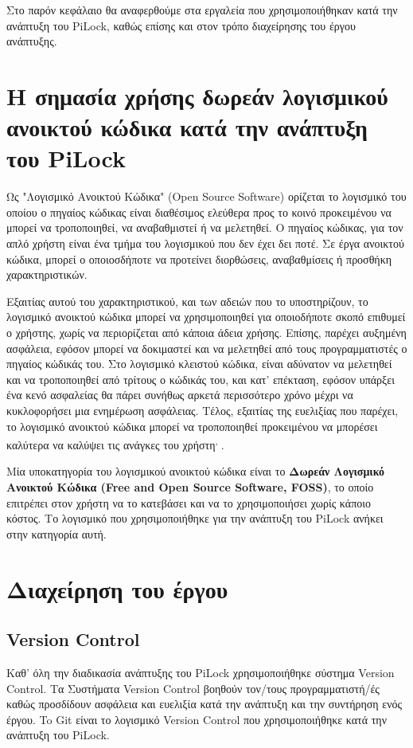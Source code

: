 Στο παρόν κεφάλαιο θα αναφερθούμε στα εργαλεία που χρησιμοποιήθηκαν κατά την ανάπτυξη του PiLock, καθώς επίσης και στον τρόπο διαχείρησης του έργου ανάπτυξης.

\section{Η σημασία χρήσης δωρεάν λογισμικού ανοικτού κώδικα κατά την ανάπτυξη του PiLock}
	Ως "Λογισμικό Ανοικτού Κώδικα" (Open Source Software) ορίζεται το λογισμικό του οποίου ο πηγαίος κώδικας είναι διαθέσιμος ελεύθερα προς το κοινό προκειμένου να μπορεί να τροποποιηθεί, να αναβαθμιστεί ή να μελετηθεί. Ο πηγαίος κώδικας, για τον απλό χρήστη είναι ένα τμήμα του λογισμικού που δεν έχει δει ποτέ. Σε έργα ανοικτού κώδικα, μπορεί ο οποιοσδήποτε να προτείνει διορθώσεις, αναβαθμίσεις ή προσθήκη χαρακτηριστικών\textsuperscript{\cite{FOSS_def}}. 

	Εξαιτίας αυτού του χαρακτηριστικού, και των αδειών που το υποστηρίζουν, το λογισμικό ανοικτού κώδικα μπορεί να χρησιμοποιηθεί για οποιοδήποτε σκοπό επιθυμεί ο χρήστης, χωρίς να περιορίζεται από κάποια άδεια χρήσης. Επίσης, παρέχει αυξημένη ασφάλεια, εφόσον μπορεί να δοκιμαστεί και να μελετηθεί από τους προγραμματιστές ο πηγαίος κώδικάς του. Στο λογισμικό κλειστού κώδικα, είναι αδύνατον να μελετηθεί και να τροποποιηθεί από τρίτους ο κώδικάς του, και κατ' επέκταση, εφόσον υπάρξει ένα κενό ασφαλείας θα πάρει συνήθως αρκετά περισσότερο χρόνο μέχρι να κυκλοφορήσει μια ενημέρωση ασφάλειας. Τέλος, εξαιτίας της ευελιξίας που παρέχει, το λογισμικό ανοικτού κώδικα μπορεί να τροποποιηθεί προκειμένου να μπορέσει καλύτερα να καλύψει τις ανάγκες του χρήστη\textsuperscript{\cite{FOSS_def}, \cite{FOSS_benefits}}.

	Μία υποκατηγορία του λογισμικού ανοικτού κώδικα είναι το \textbf{Δωρεάν Λογισμικό Ανοικτού Κώδικα (Free and Open Source Software, FOSS)}, το οποίο επιτρέπει στον χρήστη να το κατεβάσει και να το χρησιμοποιήσει χωρίς κάποιο κόστος. Το λογισμικό που χρησιμοποιήθηκε για την ανάπτυξη του PiLock ανήκει στην κατηγορία αυτή.

\section{Διαχείρηση του έργου}

	\subsection{Version Control}
		\label{subsec:vc}
		Καθ' όλη την διαδικασία ανάπτυξης του PiLock χρησιμοποιήθηκε σύστημα Version Control. Τα Συστήματα Version Control βοηθούν τον/τους προγραμματιστή/ές καθώς προσδίδουν ασφάλεια και ευελιξία κατά την ανάπτυξη και την συντήρηση ενός έργου. To Git είναι το λογισμικό Version Control που χρησιμοποιήθηκε κατά την ανάπτυξη του PiLock.

